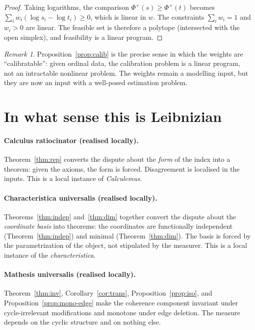\documentclass[11pt]{article}
\theoremstyle{definition}
\theoremstyle{remark}
\newtheorem{remark}[theorem]{Remark}
\newcommand{\Ph}{\Phi^{+}}
\begin{document}
\begin{proof}
Taking logarithms, the comparison $\Ph(s)\ge\Ph(t)$ becomes $\sum_i w_i(\log s_i-\log t_i)\ge 0$, which is linear in $w$. The constraints $\sum_i w_i=1$ and $w_i>0$ are linear. The feasible set is therefore a polytope (intersected with the open simplex), and feasibility is a linear program.
\end{proof}

\begin{remark}
Proposition~\ref{prop:calib} is the precise sense in which the weights are ``calibratable'': given ordinal data, the calibration problem is a linear program, not an intractable nonlinear problem. The weights remain a modelling input, but they are now an input with a well-posed estimation problem.
\end{remark}

\section{In what sense this is Leibnizian}\label{sec:leibniz}

\paragraph{Calculus ratiocinator (realised locally).} Theorem~\ref{thm:rep} converts the dispute about the \emph{form} of the index into a theorem: given the axioms, the form is forced. Disagreement is localised in the inputs. This is a local instance of \emph{Calculemus}.

\paragraph{Characteristica universalis (realised locally).} Theorems~\ref{thm:indep} and~\ref{thm:dim} together convert the dispute about the \emph{coordinate basis} into theorems: the coordinates are functionally independent (Theorem~\ref{thm:indep}) and minimal (Theorem~\ref{thm:dim}). The basis is forced by the parametrization of the object, not stipulated by the measurer. This is a local instance of the \emph{characteristica}.

\paragraph{Mathesis universalis (realised locally).} Theorem~\ref{thm:inv}, Corollary~\ref{cor:trans}, Proposition~\ref{prop:iso}, and Proposition~\ref{prop:mono-edge} make the coherence component invariant under cycle-irrelevant modifications and monotone under edge deletion. The measure depends on the cyclic structure and on nothing else.
\end{document}
